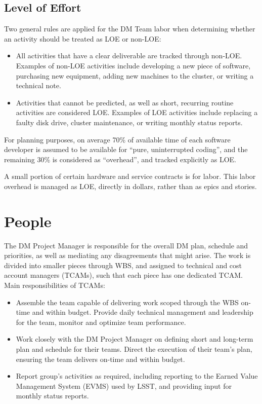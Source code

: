 \documentclass[DM,toc]{lsstdoc}
\begin{document}
\subsection{Level of Effort}
\label{\detokenize{index:level-of-effort}}
Two general rules are applied for the DM Team labor when determining whether an activity should be
treated as LOE or non-LOE:
\begin{itemize}
\item {}
All activities that have a clear deliverable are tracked through non-LOE. Examples of non-LOE
activities include developing a new piece of software, purchasing new equipment, adding new
machines to the cluster, or writing a technical note.

\item {}
Activities that cannot be predicted, as well as short, recurring routine activities are considered LOE.
Examples of LOE activities include replacing a faulty disk drive, cluster maintenance, or writing monthly
status reports.

\end{itemize}

For planning purposes, on average 70\% of available time of each software developer is assumed to be
available for ``pure, uninterrupted coding'', and the remaining 30\% is considered as ``overhead'', and tracked
explicitly as LOE.

A small portion of certain hardware and service contracts is for labor. This labor overhead is managed
as LOE, directly in dollars, rather than as epics and stories.


\section{People}
\label{\detokenize{index:people}}
The DM Project Manager is responsible for the overall DM plan, schedule and priorities, as well as
mediating any disagreements that might arise. The work is
divided into smaller pieces through WBS, and assigned to technical and cost account managers (TCAMs),
such that each piece has one dedicated TCAM. Main responsibilities of TCAMs:
\begin{itemize}
\item {}
Assemble the team capable of delivering work scoped through the WBS on-time and within budget.
Provide daily technical management and leadership for the team, monitor and optimize team performance.

\item {}
Work closely with the DM Project Manager on defining short and long-term plan and schedule for
their teams. Direct the execution of their team's plan, ensuring the team delivers on-time and within budget.

\item {}
Report group's activities as required, including reporting to the Earned Value Management System (EVMS)
used by LSST, and providing input for monthly status reports.

\end{itemize}
\end{document}
